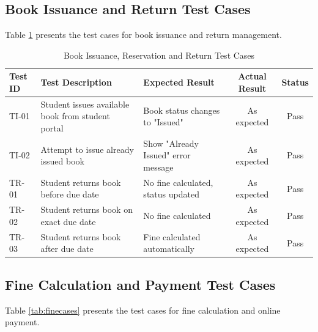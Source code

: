 \documentclass[12pt,a4paper]{report}
\begin{document}
\subsection{Book Issuance and Return Test Cases}

Table \ref{tab:issuecases} presents the test cases for book issuance and return management.

\vspace{0.1cm}

\begin{table}[H]
\centering
\begin{tabularx}{\textwidth}{|l|X|X|c|c|}
\hline
\textbf{Test ID} & \textbf{Test Description} & \textbf{Expected Result} & \textbf{Actual Result} & \textbf{Status} \\
\hline
TI-01 & Student issues available book from student portal & Book status changes to "Issued" & As expected & Pass \\
\hline
TI-02 & Attempt to issue already issued book & Show "Already Issued" error message & As expected & Pass \\
\hline
TR-01 & Student returns book before due date & No fine calculated, status updated & As expected & Pass \\
\hline
TR-02 & Student returns book on exact due date & No fine calculated & As expected & Pass \\
\hline
TR-03 & Student returns book after due date & Fine calculated automatically & As expected & Pass \\
\hline
\end{tabularx}
\caption{Book Issuance, Reservation and Return Test Cases}
\label{tab:issuecases}
\end{table}

\newpage

\subsection{Fine Calculation and Payment Test Cases}

Table \ref{tab:finecases} presents the test cases for fine calculation and online payment.

\vspace{0.2cm}
\end{document}
